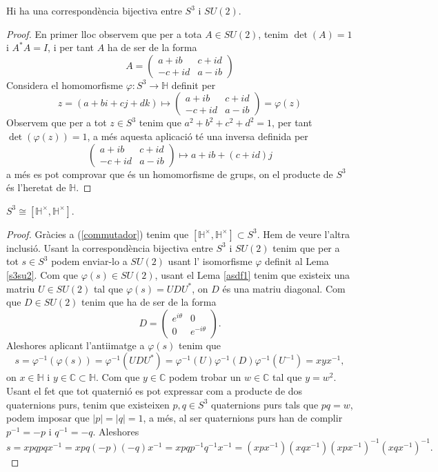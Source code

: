 \begin{lemma}\label{s3su2}
Hi ha una correspondència bijectiva entre $S^3$ i $SU(2)$.
\end{lemma}
\begin{proof}
En primer lloc observem que per a tota   $A\in SU(2)$, tenim $\det(A)=1$ i $A^*A=I$, i per tant $A$ ha de ser de la forma
$$
A=\left( \begin{matrix}
  a+ib & c+id \\
  -c+id & a-ib
 \end{matrix} \right)
$$
Considera el homomorfisme $\varphi: S^3 \rightarrow \mathbb{H}$ definit per
$$z=(a+bi+cj+dk) \mapsto
\left( \begin{matrix}
  a+ib & c+id \\
  -c+id & a-ib
 \end{matrix} \right) = \varphi(z)
$$
Observem que per a tot $z\in S^3$ tenim que $a^2+b^2+c^2+d^2=1$, per tant $\det (\varphi(z))=1$, a més aquesta aplicació té una inversa definida per 
$$
\left( \begin{matrix}
  a+ib & c+id \\
  -c+id & a-ib
 \end{matrix} \right)
 \mapsto 
 a+ib+(c+id)j
$$
 a més es pot comprovar que és un homomorfisme de grups, on el producte de $S^3$ és l'heretat de $\mathbb{H}$.
\end{proof}
\begin{prop}
$S^3 \cong [\mathbb{H}^\times, \mathbb{H}^\times]$.
\end{prop}
\begin{proof}\label{espectral}
Gràcies a (\ref{commutador}) tenim que $[\mathbb{H}^\times,\mathbb{H}^\times]\subset S^3$. Hem de veure l'altra inclusió.
Usant la correspondència bijectiva entre $S^3$ i $SU(2)$ tenim que per a tot $s\in S^3$ podem enviar-lo a $SU(2)$ usant l' isomorfisme $\varphi$ definit al Lema \ref{s3su2}. Com que $\varphi(s)\in SU(2)$, usant el Lema \ref{asdf1} tenim que existeix una matriu $U\in SU(2)$ tal que $\varphi(s)=UDU^*$, on $D$ és una matriu diagonal. Com que   $D\in SU(2)$ tenim que ha de ser de la forma
$$
D=\left( \begin{matrix}
  e^{i\theta} & 0 \\
  0 & e^{-i\theta}
 \end{matrix} \right).	
$$
 Aleshores aplicant l'antiimatge a $\varphi(s)$ tenim que
 $$
 s=\varphi^{-1}(\varphi(s))=\varphi^{-1}(UDU^*)=\varphi^{-1}(U)\varphi^{-1}(D)\varphi^{-1}(U^{-1})=xyx^{-1},
 $$
 on $x\in \mathbb{H}$ i $y\in \mathbb{C}\subset \mathbb{H}$. Com que $y\in \mathbb{C}$ podem trobar un $w\in \mathbb{C}$ tal que $y=w^2$. Usant el fet que tot quaternió es pot expressar com a producte de dos quaternions purs, tenim que existeixen $p,q\in S^3$ quaternions purs tals que $pq=w$, podem imposar que $|p|=|q|=1$, a més, al ser quaternions purs han de complir $p^{-1}=-p$ i $q^{-1}=-q$. Aleshores
 $$
 s= xpqpqx^{-1}=xpq(-p)(-q)x^{-1}=xpqp^{-1}q^{-1}x^{-1} = (xpx^{-1})(xqx^{-1})(xpx^{-1})^{-1}(xqx^{-1})^{-1}.
 $$
 
\end{proof}





